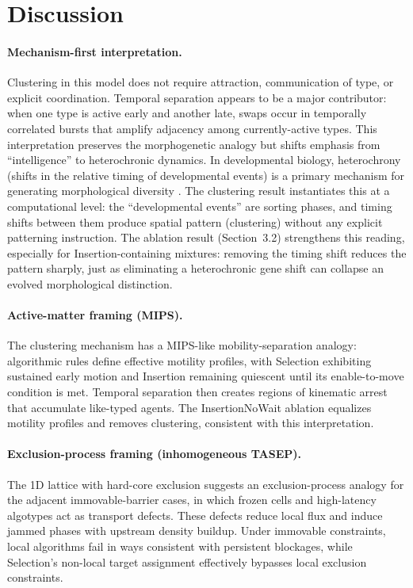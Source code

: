 \documentclass[11pt]{article}
\begin{document}
\section{Discussion}
\label{sec:discussion}
\paragraph{Mechanism-first interpretation.}
Clustering in this model does not require attraction, communication of type, or explicit
coordination. Temporal separation appears to be a major contributor: when one type is active early
and another late, swaps occur in temporally correlated bursts that amplify adjacency among
currently-active types.
This interpretation preserves the morphogenetic analogy but shifts emphasis from ``intelligence'' to
heterochronic dynamics. In developmental biology, heterochrony (shifts in the relative timing of
developmental events) is a primary mechanism for generating morphological diversity
\cite{gould1977ontogeny}. The clustering result instantiates this at a computational level: the
``developmental events'' are sorting phases, and timing shifts between them produce spatial pattern
(clustering) without any explicit patterning instruction. The ablation result (Section~3.2)
strengthens this reading, especially for Insertion-containing mixtures: removing the timing shift
reduces the pattern sharply, just as eliminating a heterochronic gene shift can collapse an evolved
morphological distinction.

\paragraph{Active-matter framing (MIPS).}
The clustering mechanism has a MIPS-like mobility-separation analogy: algorithmic rules define
effective motility profiles, with Selection exhibiting sustained early motion and Insertion remaining
quiescent until its enable-to-move condition is met. Temporal separation then creates regions of
kinematic arrest that accumulate like-typed agents. The InsertionNoWait ablation equalizes motility
profiles and removes clustering, consistent with this interpretation.

\paragraph{Exclusion-process framing (inhomogeneous TASEP).}
The 1D lattice with hard-core exclusion suggests an exclusion-process analogy for the adjacent
immovable-barrier cases, in which frozen cells and high-latency algotypes act as transport defects.
These defects reduce local flux and induce jammed phases with upstream density buildup. Under
immovable constraints, local algorithms fail in ways consistent with persistent blockages, while
Selection’s non-local target assignment effectively bypasses local exclusion constraints.
\end{document}
